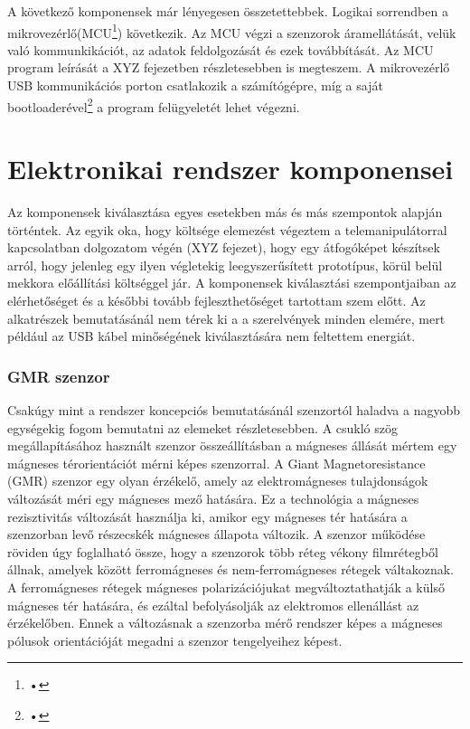A következő komponensek már lényegesen összetettebbek. Logikai sorrendben a mikrovezérlő(MCU\footnote{•}) következik. Az MCU végzi a szenzorok áramellátását, velük való kommunkikációt, az adatok feldolgozását és ezek továbbítását. Az MCU program leírását a XYZ fejezetben részletesebben is megteszem. A mikrovezérlő USB kommunikációs porton csatlakozik a számítógépre, míg a saját bootloaderével\footnote{•} a program felügyeletét lehet végezni.

\section{Elektronikai rendszer komponensei}

Az komponensek kiválasztása egyes esetekben más és más szempontok alapján történtek. Az egyik oka, hogy költsége elemezést végeztem a telemanipulátorral kapcsolatban dolgozatom végén (XYZ fejezet), hogy egy átfogóképet készítsek arról, hogy jelenleg egy ilyen végletekig leegyszerűsített prototípus, körül belül mekkora előállítási költséggel jár. A komponensek kiválasztási szempontjaiban az elérhetőséget és a későbbi tovább fejleszthetőséget tartottam szem előtt. Az alkatrészek bemutatásánál nem térek ki a a szerelvények minden elemére, mert például az USB kábel minőségének kiválasztására nem feltettem energiát.

\subsubsection{GMR szenzor}

Csakúgy mint a rendszer koncepciós bemutatásánál szenzortól haladva a nagyobb egységekig fogom bemutatni az elemeket részletesebben. A csukló szög megállapításához használt szenzor összeállításban a mágneses állását mértem egy mágneses térorientációt mérni képes szenzorral. A Giant Magnetoresistance (GMR) szenzor egy olyan érzékelő, amely az elektromágneses tulajdonságok változását méri egy mágneses mező hatására. Ez a technológia a mágneses rezisztivitás változását használja ki, amikor egy mágneses tér hatására a szenzorban levő részecskék mágneses állapota változik. A szenzor működése röviden úgy foglalható össze, hogy a szenzorok több réteg vékony filmrétegből állnak, amelyek között ferromágneses és nem-ferromágneses rétegek váltakoznak. A ferromágneses rétegek mágneses polarizációjukat megváltoztathatják a külső mágneses tér hatására, és ezáltal befolyásolják az elektromos ellenállást az érzékelőben. Ennek a változásnak a szenzorba mérő rendszer képes a mágneses pólusok orientációját megadni a szenzor tengelyeihez képest.

